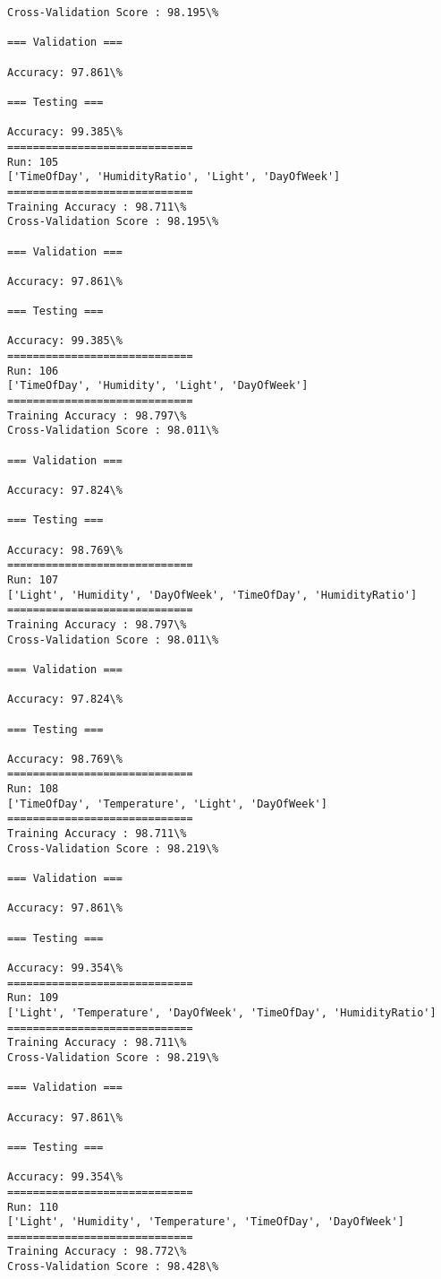 \documentclass[11pt]{article}
\begin{document}
    \begin{Verbatim}[commandchars=\\\{\}]
Cross-Validation Score : 98.195\%

=== Validation ===

Accuracy: 97.861\%

=== Testing ===

Accuracy: 99.385\%
=============================
Run: 105
['TimeOfDay', 'HumidityRatio', 'Light', 'DayOfWeek']
=============================
Training Accuracy : 98.711\%
Cross-Validation Score : 98.195\%

=== Validation ===

Accuracy: 97.861\%

=== Testing ===

Accuracy: 99.385\%
=============================
Run: 106
['TimeOfDay', 'Humidity', 'Light', 'DayOfWeek']
=============================
Training Accuracy : 98.797\%
Cross-Validation Score : 98.011\%

=== Validation ===

Accuracy: 97.824\%

=== Testing ===

Accuracy: 98.769\%
=============================
Run: 107
['Light', 'Humidity', 'DayOfWeek', 'TimeOfDay', 'HumidityRatio']
=============================
Training Accuracy : 98.797\%
Cross-Validation Score : 98.011\%

=== Validation ===

Accuracy: 97.824\%

=== Testing ===

Accuracy: 98.769\%
=============================
Run: 108
['TimeOfDay', 'Temperature', 'Light', 'DayOfWeek']
=============================
Training Accuracy : 98.711\%
Cross-Validation Score : 98.219\%

=== Validation ===

Accuracy: 97.861\%

=== Testing ===

Accuracy: 99.354\%
=============================
Run: 109
['Light', 'Temperature', 'DayOfWeek', 'TimeOfDay', 'HumidityRatio']
=============================
Training Accuracy : 98.711\%
Cross-Validation Score : 98.219\%

=== Validation ===

Accuracy: 97.861\%

=== Testing ===

Accuracy: 99.354\%
=============================
Run: 110
['Light', 'Humidity', 'Temperature', 'TimeOfDay', 'DayOfWeek']
=============================
Training Accuracy : 98.772\%
Cross-Validation Score : 98.428\%


\end{Verbatim}
\end{document}

